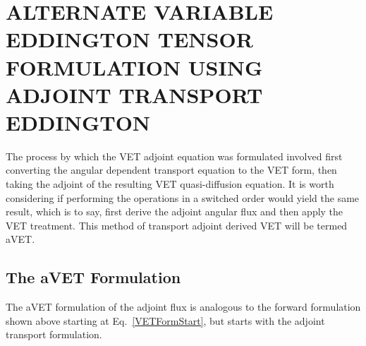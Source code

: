 \documentclass[12pt]{report}
\begin{document}
\chapter{\uppercase {Alternate Variable Eddington Tensor Formulation Using Adjoint Transport Eddington}} \label{chap:aVET}
The process by which the VET adjoint equation was formulated involved first converting the angular dependent transport equation to the VET form, then taking the adjoint of the resulting VET quasi-diffusion equation. It is worth considering if performing the operations in a switched order would yield the same result, which is to say, first derive the adjoint  angular flux and then apply the VET treatment. This method of transport adjoint derived VET will be termed aVET.

\section{The aVET Formulation}
The aVET formulation of the adjoint flux is analogous to the forward formulation shown above starting at Eq.~\eqref{VETFormStart}, but starts with the adjoint transport formulation. 
\end{document}

